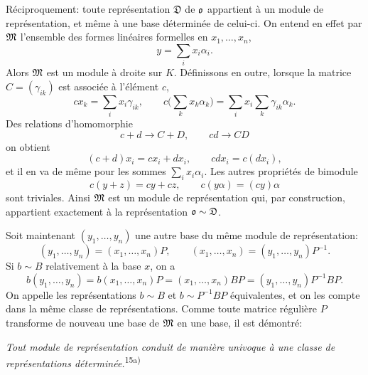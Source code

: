 Réciproquement: toute représentation $\mathfrak D$ de $\mathfrak{o}$ appartient à un module de représentation, et même à une base déterminée de celui-ci. On entend en effet par $\mathfrak{M}$ l'ensemble des formes linéaires formelles en $x_1,\ldots,x_n$,
\[
        y=\sum_i x_i\alpha_i.
\]
Alors $\mathfrak{M}$ est un module à droite sur $K$. Définissons en outre, lorsque la matrice $C=(\gamma_{ik})$ est associée à l'élément $c$,
\[
        cx_k=\sum_i x_i\gamma_{ik},
        \qquad
        c\biggl(\sum_k x_k\alpha_k\biggr)=\sum_i x_i\sum_k\gamma_{ik}\alpha_k.
\]
Des relations d'homomorphie
\[
        c+d\to C+D,
        \qquad cd\to CD
\]
on obtient
\[
        (c+d)x_i=cx_i+dx_i,
        \qquad cdx_i=c(dx_i),
\]
et il en va de même pour les sommes $\sum_i x_i\alpha_i$. Les autres propriétés de bimodule
\[
        c(y+z)=cy+cz,
        \qquad c(y\alpha)=(cy)\alpha
\]
sont triviales. Ainsi $\mathfrak{M}$ est un module de représentation qui, par construction, appartient exactement à la représentation $\mathfrak{o}\sim\mathfrak D$.

Soit maintenant $(y_1,\ldots,y_n)$ une autre base du même module de représentation:
\[
        (y_1,\ldots,y_n)=(x_1,\ldots,x_n)P,
        \qquad
        (x_1,\ldots,x_n)=(y_1,\ldots,y_n)P^{-1}.
\]
Si $b\sim B$ relativement à la base $x$, on a
\[
        b(y_1,\ldots,y_n)=b(x_1,\ldots,x_n)P
        =(x_1,\ldots,x_n)BP
        =(y_1,\ldots,y_n)P^{-1}BP.
\]
On appelle les représentations $b\sim B$ et $b\sim P^{-1}BP$ équivalentes, et on les compte dans la même classe de représentations. Comme toute matrice régulière $P$ transforme de nouveau une base de $\mathfrak{M}$ en une base, il est démontré:

\emph{Tout module de représentation conduit de manière univoque à une classe de représentations déterminée.}\textsuperscript{15a)}

